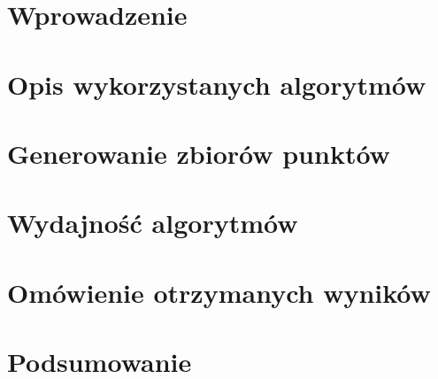 \documentclass{sprawozdanie-agh}
\begin{document}

\stronatytulowa{}

\section{Wprowadzenie}

\section{Opis wykorzystanych algorytmów}



\section{Generowanie zbiorów punktów}



\section{Wydajność algorytmów}


\section{Omówienie otrzymanych wyników}

\section{Podsumowanie}

\end{document}
